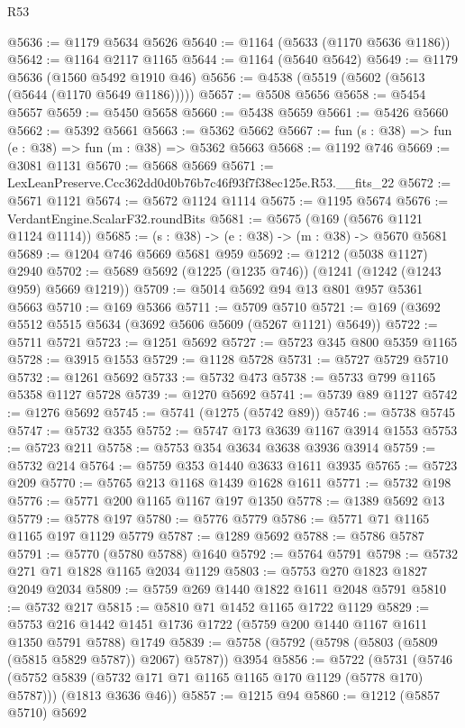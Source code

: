 \begin{lexlean}{R53}
\begin{coremodule}
@5636 := @1179 @5634 @5626
@5640 := @1164 (@5633 (@1170 @5636 @1186))
@5642 := @1164 @2117 @1165
@5644 := @1164 (@5640 @5642)
@5649 := @1179 @5636 (@1560 @5492 @1910 @46)
@5656 := @4538 (@5519 (@5602 (@5613 (@5644 (@1170 @5649 @1186)))))
@5657 := @5508 @5656
@5658 := @5454 @5657
@5659 := @5450 @5658
@5660 := @5438 @5659
@5661 := @5426 @5660
@5662 := @5392 @5661
@5663 := @5362 @5662
@5667 := fun (s : @38) => fun (e : @38) => fun (m : @38) => @5362 @5663
@5668 := @1192 @746
@5669 := @3081 @1131
@5670 := @5668 @5669
@5671 := LexLeanPreserve.Ccc362dd0d0b76b7c46f93f7f38ec125e.R53.__fits_22
@5672 := @5671 @1121
@5674 := @5672 @1124 @1114
@5675 := @1195 @5674
@5676 := VerdantEngine.ScalarF32.roundBits
@5681 := @5675 (@169 (@5676 @1121 @1124 @1114))
@5685 := (s : @38) -> (e : @38) -> (m : @38) -> @5670 @5681
@5689 := @1204 @746 @5669 @5681 @959
@5692 := @1212 (@5038 @1127) @2940
@5702 := @5689 @5692 (@1225 (@1235 @746)) (@1241 (@1242 (@1243 @959) @5669 @1219))
@5709 := @5014 @5692 @94 @13 @801 @957 @5361 @5663
@5710 := @169 @5366
@5711 := @5709 @5710
@5721 := @169 (@3692 @5512 @5515 @5634 (@3692 @5606 @5609 (@5267 @1121) @5649))
@5722 := @5711 @5721
@5723 := @1251 @5692
@5727 := @5723 @345 @800 @5359 @1165
@5728 := @3915 @1553
@5729 := @1128 @5728
@5731 := @5727 @5729 @5710
@5732 := @1261 @5692
@5733 := @5732 @473
@5738 := @5733 @799 @1165 @5358 @1127 @5728
@5739 := @1270 @5692
@5741 := @5739 @89 @1127
@5742 := @1276 @5692
@5745 := @5741 (@1275 (@5742 @89))
@5746 := @5738 @5745
@5747 := @5732 @355
@5752 := @5747 @173 @3639 @1167 @3914 @1553
@5753 := @5723 @211
@5758 := @5753 @354 @3634 @3638 @3936 @3914
@5759 := @5732 @214
@5764 := @5759 @353 @1440 @3633 @1611 @3935
@5765 := @5723 @209
@5770 := @5765 @213 @1168 @1439 @1628 @1611
@5771 := @5732 @198
@5776 := @5771 @200 @1165 @1167 @197 @1350
@5778 := @1389 @5692 @13
@5779 := @5778 @197
@5780 := @5776 @5779
@5786 := @5771 @71 @1165 @1165 @197 @1129 @5779
@5787 := @1289 @5692
@5788 := @5786 @5787
@5791 := @5770 (@5780 @5788) @1640
@5792 := @5764 @5791
@5798 := @5732 @271 @71 @1828 @1165 @2034 @1129
@5803 := @5753 @270 @1823 @1827 @2049 @2034
@5809 := @5759 @269 @1440 @1822 @1611 @2048 @5791
@5810 := @5732 @217
@5815 := @5810 @71 @1452 @1165 @1722 @1129
@5829 := @5753 @216 @1442 @1451 @1736 @1722 (@5759 @200 @1440 @1167 @1611 @1350 @5791 @5788) @1749
@5839 := @5758 (@5792 (@5798 (@5803 (@5809 (@5815 @5829 @5787)) @2067) @5787)) @3954
@5856 := @5722
    (@5731
      (@5746 (@5752 @5839 (@5732 @171 @71 @1165 @1165 @170 @1129 (@5778 @170) @5787)))
      (@1813 @3636 @46))
@5857 := @1215 @94
@5860 := @1212 (@5857 @5710) @5692

\end{coremodule}
\end{lexlean}
